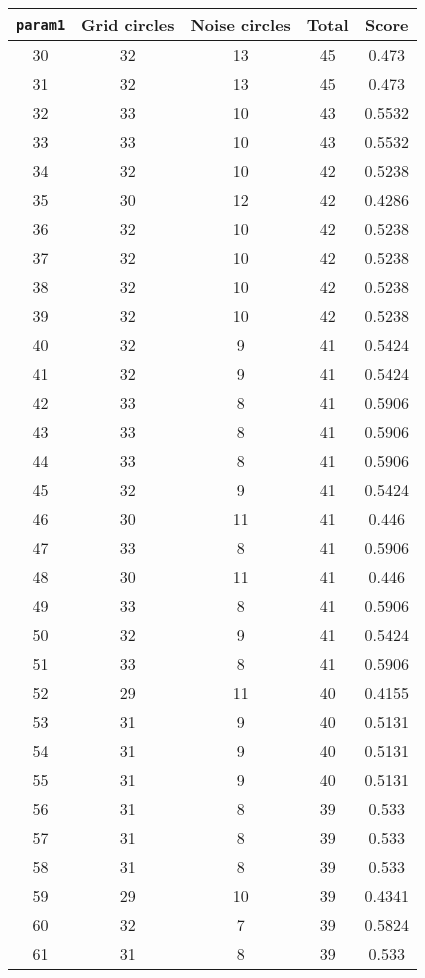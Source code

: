 \documentclass[letterpaper, 12pt]{article}
\begin{document}
\begin{longtable}{|c|c|c|c|c|}
\hline
\textbf{\texttt{param1}} & \textbf{Grid circles} & \textbf{Noise circles} & \textbf{Total} & \textbf{Score} \\
\hline
30 & 32 & 13 & 45 & 0.473 \\
\hline
31 & 32 & 13 & 45 & 0.473 \\
\hline
32 & 33 & 10 & 43 & 0.5532 \\
\hline
33 & 33 & 10 & 43 & 0.5532 \\
\hline
34 & 32 & 10 & 42 & 0.5238 \\
\hline
35 & 30 & 12 & 42 & 0.4286 \\
\hline
36 & 32 & 10 & 42 & 0.5238 \\
\hline
37 & 32 & 10 & 42 & 0.5238 \\
\hline
38 & 32 & 10 & 42 & 0.5238 \\
\hline
39 & 32 & 10 & 42 & 0.5238 \\
\hline
40 & 32 & 9 & 41 & 0.5424 \\
\hline
41 & 32 & 9 & 41 & 0.5424 \\
\hline
42 & 33 & 8 & 41 & 0.5906 \\
\hline
43 & 33 & 8 & 41 & 0.5906 \\
\hline
44 & 33 & 8 & 41 & 0.5906 \\
\hline
45 & 32 & 9 & 41 & 0.5424 \\
\hline
46 & 30 & 11 & 41 & 0.446 \\
\hline
47 & 33 & 8 & 41 & 0.5906 \\
\hline
48 & 30 & 11 & 41 & 0.446 \\
\hline
49 & 33 & 8 & 41 & 0.5906 \\
\hline
50 & 32 & 9 & 41 & 0.5424 \\
\hline
51 & 33 & 8 & 41 & 0.5906 \\
\hline
52 & 29 & 11 & 40 & 0.4155 \\
\hline
53 & 31 & 9 & 40 & 0.5131 \\
\hline
54 & 31 & 9 & 40 & 0.5131 \\
\hline
55 & 31 & 9 & 40 & 0.5131 \\
\hline
56 & 31 & 8 & 39 & 0.533 \\
\hline
57 & 31 & 8 & 39 & 0.533 \\
\hline
58 & 31 & 8 & 39 & 0.533 \\
\hline
59 & 29 & 10 & 39 & 0.4341 \\
\hline
60 & 32 & 7 & 39 & 0.5824 \\
\hline
61 & 31 & 8 & 39 & 0.533 \\

\end{longtable}
\end{document}
